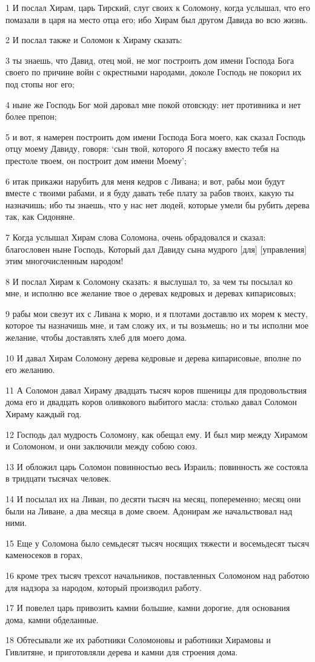 \par 1 И послал Хирам, царь Тирский, слуг своих к Соломону, когда услышал, что его помазали в царя на место отца его; ибо Хирам был другом Давида во всю жизнь.
\par 2 И послал также и Соломон к Хираму сказать:
\par 3 ты знаешь, что Давид, отец мой, не мог построить дом имени Господа Бога своего по причине войн с окрестными народами, доколе Господь не покорил их под стопы ног его;
\par 4 ныне же Господь Бог мой даровал мне покой отовсюду: нет противника и нет более препон;
\par 5 и вот, я намерен построить дом имени Господа Бога моего, как сказал Господь отцу моему Давиду, говоря: `сын твой, которого Я посажу вместо тебя на престоле твоем, он построит дом имени Моему';
\par 6 итак прикажи нарубить для меня кедров с Ливана; и вот, рабы мои будут вместе с твоими рабами, и я буду давать тебе плату за рабов твоих, какую ты назначишь; ибо ты знаешь, что у нас нет людей, которые умели бы рубить дерева так, как Сидоняне.
\par 7 Когда услышал Хирам слова Соломона, очень обрадовался и сказал: благословен ныне Господь, Который дал Давиду сына мудрого [для] [управления] этим многочисленным народом!
\par 8 И послал Хирам к Соломону сказать: я выслушал то, за чем ты посылал ко мне, и исполню все желание твое о деревах кедровых и деревах кипарисовых;
\par 9 рабы мои свезут их с Ливана к морю, и я плотами доставлю их морем к месту, которое ты назначишь мне, и там сложу их, и ты возьмешь; но и ты исполни мое желание, чтобы доставлять хлеб для моего дома.
\par 10 И давал Хирам Соломону дерева кедровые и дерева кипарисовые, вполне по его желанию.
\par 11 А Соломон давал Хираму двадцать тысяч коров пшеницы для продовольствия дома его и двадцать коров оливкового выбитого масла: столько давал Соломон Хираму каждый год.
\par 12 Господь дал мудрость Соломону, как обещал ему. И был мир между Хирамом и Соломоном, и они заключили между собою союз.
\par 13 И обложил царь Соломон повинностью весь Израиль; повинность же состояла в тридцати тысячах человек.
\par 14 И посылал их на Ливан, по десяти тысяч на месяц, попеременно; месяц они были на Ливане, а два месяца в доме своем. Адонирам же начальствовал над ними.
\par 15 Еще у Соломона было семьдесят тысяч носящих тяжести и восемьдесят тысяч каменосеков в горах,
\par 16 кроме трех тысяч трехсот начальников, поставленных Соломоном над работою для надзора за народом, который производил работу.
\par 17 И повелел царь привозить камни большие, камни дорогие, для основания дома, камни обделанные.
\par 18 Обтесывали же их работники Соломоновы и работники Хирамовы и Гивлитяне, и приготовляли дерева и камни для строения дома.

